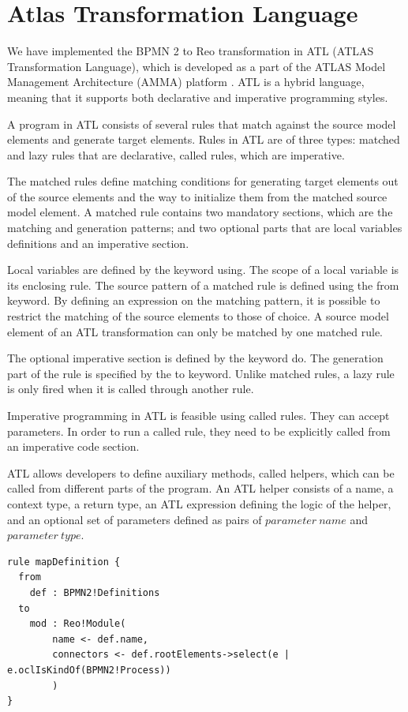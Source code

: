 \section{Atlas Transformation Language}
\label{sec:atl}
We have implemented the BPMN 2 to Reo transformation in ATL (ATLAS Transformation Language), which is
developed as a part of the ATLAS Model Management Architecture (AMMA)
platform \cite{AMMA}. ATL is a hybrid language, meaning that it supports both declarative and imperative programming styles.

A program in ATL consists of several rules that match against the source model elements and generate target elements.
Rules in ATL are of three types: {matched} and {lazy} rules that are declarative, {called} rules, which  are imperative.

 The matched rules define matching conditions for generating target elements out of the source elements and the way to initialize them from the matched source model element. 
A matched rule contains two mandatory sections, which are the matching and generation patterns; and two optional parts that are local variables definitions and an imperative section. 

Local variables are defined by the keyword {using}. The scope of a local variable is its enclosing rule. The source pattern of a matched rule is defined using the {from} keyword. By defining an expression on the matching pattern, it is possible to restrict the matching of the source elements to those of choice. 
 A source model element of an ATL transformation can only be matched by one  matched rule. 

The optional imperative section is defined by the keyword {do}.
 The generation part of the rule is specified by the {to} keyword. 
 Unlike {matched} rules, a {lazy} rule is only fired when it is called through another rule. 

Imperative programming in ATL is feasible %
using {called} rules. They can accept parameters. In order to run a {called} rule, they need to be explicitly called from an imperative code section.

ATL allows developers to define auxiliary methods, called {helper}s, which can be called from different parts of the program. An ATL helper consists of a {name}, a {context} type, a return type, an ATL expression defining the logic of the {helper}, and an optional set of parameters defined as pairs of $parameter\ name$ and $parameter\ type$.

\begin{lstlisting}[float,frame=single,caption=Definition mapping rule,label=lst:def2mod]  
rule mapDefinition {
  from
    def : BPMN2!Definitions
  to
    mod : Reo!Module(
        name <- def.name, 
        connectors <- def.rootElements->select(e | e.oclIsKindOf(BPMN2!Process))
        )
} 
\end{lstlisting}

